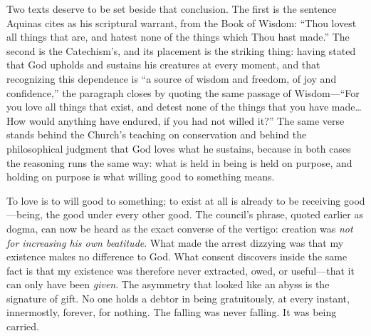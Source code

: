 Two texts deserve to be set beside that conclusion. The first is the sentence Aquinas cites as his scriptural warrant, from the Book of Wisdom: ``Thou lovest all things that are, and hatest none of the things which Thou hast made.'' The second is the Catechism's, and its placement is the striking thing: having stated that God upholds and sustains his creatures at every moment, and that recognizing this dependence is ``a source of wisdom and freedom, of joy and confidence,'' the paragraph closes by quoting the same passage of Wisdom---``For you love all things that exist, and detest none of the things that you have made\ldots{} How would anything have endured, if you had not willed it?'' The same verse stands behind the Church's teaching on conservation and behind the philosophical judgment that God loves what he sustains, because in both cases the reasoning runs the same way: what is held in being is held on purpose, and holding on purpose is what willing good to something means.

To love is to will good to something; to exist at all is already to be receiving good---being, the good under every other good. The council's phrase, quoted earlier as dogma, can now be heard as the exact converse of the vertigo: creation was \emph{not for increasing his own beatitude}. What made the arrest dizzying was that my existence makes no difference to God. What consent discovers inside the same fact is that my existence was therefore never extracted, owed, or useful---that it can only have been \emph{given}. The asymmetry that looked like an abyss is the signature of gift. No one holds a debtor in being gratuitously, at every instant, innermostly, forever, for nothing. The falling was never falling. It was being carried.

